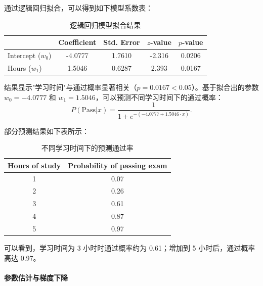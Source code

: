 通过逻辑回归拟合，可以得到如下模型系数表：

\begin{table}[H]
    \centering
    \caption{逻辑回归模型拟合结果}
    \label{tab:logistic_results}
    \begin{tabular}{lcccc}
        \toprule
        & \textbf{Coefficient} & \textbf{Std. Error} & \textbf{$z$-value} & \textbf{$p$-value} \\
        \midrule
        Intercept ($w_0$) & -4.0777 & 1.7610 & -2.316 & 0.0206 \\
        Hours ($w_1$) & 1.5046 & 0.6287 & 2.393 & 0.0167 \\
        \bottomrule
    \end{tabular}
\end{table}

结果显示"学习时间"与通过概率显著相关（$p=0.0167 < 0.05$）。基于拟合出的参数 $w_0 = -4.0777$ 和 $w_1 = 1.5046$，可以预测不同学习时间下的通过概率：
\[
P(\text{Pass}|x) = \frac{1}{1 + e^{-(-4.0777 + 1.5046 \cdot x)}}.
\]

部分预测结果如下表所示：

\begin{table}[H]
    \centering
    \caption{不同学习时间下的预测通过率}
    \label{tab:prob_prediction}
    \begin{tabular}{cc}
        \toprule
        \textbf{Hours of study} & \textbf{Probability of passing exam} \\
        \midrule
        1 & 0.07 \\
        2 & 0.26 \\
        3 & 0.61 \\
        4 & 0.87 \\
        5 & 0.97 \\
        \bottomrule
    \end{tabular}
\end{table}

可以看到，学习时间为 3 小时时通过概率约为 0.61；增加到 5 小时后，通过概率高达 0.97。

\paragraph{参数估计与梯度下降}

